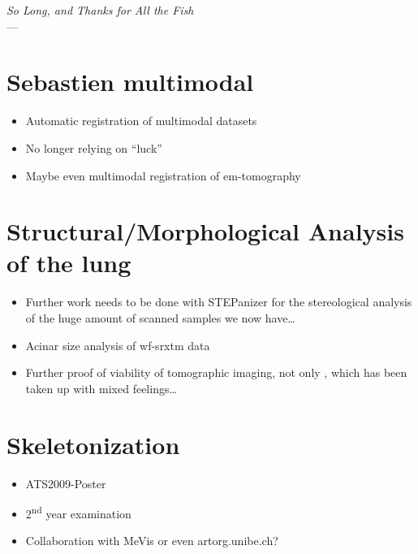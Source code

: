 \acresetall
{}\label{ch:outlook}
\begin{flushright}{\slshape    
		So Long, and Thanks for All the Fish} \\ \medskip
    ---  \citep{Adams1984}
\end{flushright}
\vspace{52mm}

\section{Sebastien multimodal}
\begin{itemize}
	\item Automatic registration of multimodal datasets
	\item No longer relying on ``luck''
	\item Maybe even multimodal registration of \ac{em}-tomography
\end{itemize}

\section{Structural/Morphological Analysis of the lung}
\begin{itemize}
	\item Further work needs to be done with STEPanizer for the stereological analysis of the huge amount of scanned samples we now have\ldots
	\item Acinar size analysis of \ac{wf-srxtm} data
	\item Further proof of viability of tomographic imaging, not only \cite{Tsuda2008}, which has been taken up with mixed feelings\ldots
\end{itemize}

\section{Skeletonization}
\begin{itemize}
	\item ATS2009-Poster
	\item 2\textsuperscript{nd} year examination
	\item Collaboration with MeVis or even artorg.unibe.ch?
\end{itemize}

